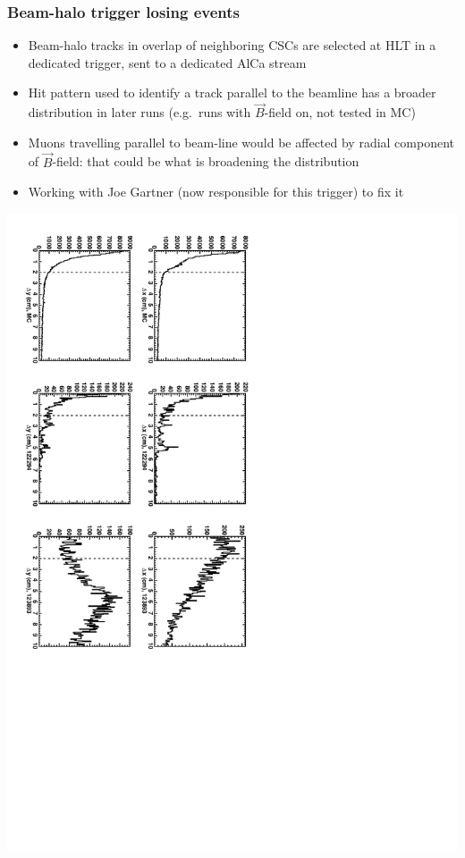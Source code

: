 \documentclass[compress]{beamer}
\begin{document}
\begin{frame}
\frametitle{Beam-halo trigger losing events}

\scriptsize
\begin{itemize}
\item Beam-halo tracks in overlap of neighboring CSCs are selected at HLT in a dedicated trigger, sent to a dedicated AlCa stream
\item Hit pattern used to identify a track parallel to the beamline
  has a broader distribution in later runs (e.g.\ runs with
  $\vec{B}$-field on, not tested in MC)
\item Muons travelling parallel to beam-line would be affected by radial component of $\vec{B}$-field: that could be what is broadening the distribution
\item Working with Joe Gartner (now responsible for this trigger) to fix it
\end{itemize}

\includegraphics[height=0.9\linewidth, angle=90]{HLT_CSCBeamHaloOverlaps.pdf}

\end{frame}
\end{document}
